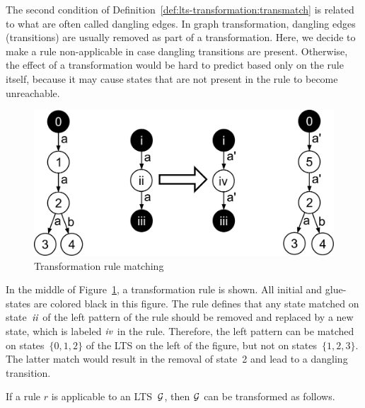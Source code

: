 The second condition of Definition~\ref{def:lts-transformation:transmatch} is related to what are often called dangling edges.
In graph transformation, dangling edges (transitions) are usually removed as part of a transformation.
Here, we decide to make a rule non-applicable in case dangling transitions are present.
Otherwise, the effect of a transformation would be hard to predict based only on the rule itself, because it may cause states that are not present in the rule to become unreachable.

\begin{figure}[hbt]
\centering
\includegraphics[scale=0.19]{lts-transformation/figs/matching}
\caption{Transformation rule matching}
\label{fig:lts-transformation:match}
\end{figure}

In the middle of Figure~\ref{fig:lts-transformation:match}, a transformation rule is shown.
All initial and glue-states are colored black in this figure.
The rule defines that any state matched on state~$\it{ii}$ of the left pattern of the rule should be removed and replaced by a new state, which is labeled $\it{iv}$ in the rule.
Therefore, the left pattern can be matched on states~$\{ 0,1,2\}$ of the LTS on the left of the figure, but not on states~$\{ 1,2,3\}$.
The latter match would result in the removal of state~2 and lead to a dangling transition.

If a rule $r$ is applicable to an LTS~$\mathcal{G}$, then $\mathcal{G}$ can be transformed as follows.

